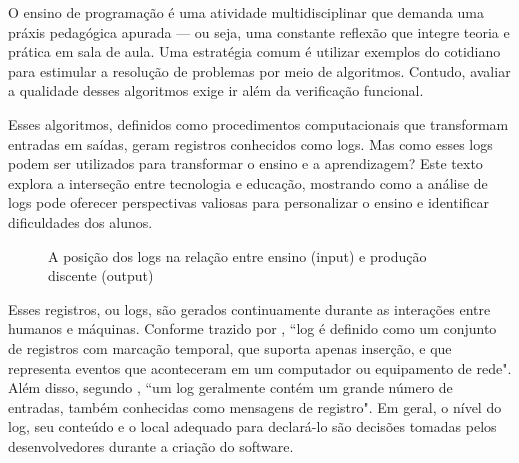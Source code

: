 O ensino de programação é uma atividade multidisciplinar que 
demanda uma práxis pedagógica apurada --- ou seja, uma constante 
reflexão que integre teoria e prática em sala de aula. Uma 
estratégia comum é utilizar exemplos do cotidiano para estimular 
a resolução de problemas por meio de algoritmos. Contudo, 
avaliar a qualidade desses algoritmos exige ir além da 
verificação funcional. 

Esses algoritmos, definidos como procedimentos computacionais que 
transformam entradas em saídas, geram registros conhecidos como 
logs. Mas como esses logs podem ser utilizados para transformar o 
ensino e a aprendizagem? Este texto explora a interseção entre 
tecnologia e educação, mostrando como a análise de logs pode 
oferecer perspectivas valiosas para personalizar o ensino e 
identificar dificuldades dos alunos.

\begin{figure}[H]
\centering
{}
\caption{A posição dos logs na relação entre ensino (input) e produção discente 
(output)}
\label{fig:logs-intersecao}
\end{figure}

Esses registros, ou logs, são gerados continuamente durante as 
interações entre humanos e máquinas. Conforme trazido por 
\cite{clemente2008arquitetura}, ``log é definido como um 
conjunto de registros com marcação temporal, que suporta apenas 
inserção, e que representa eventos que aconteceram em um 
computador ou equipamento de rede". 
Além disso, segundo \cite{gu2022logging}, ``um log geralmente 
contém um grande número de entradas, também conhecidas como 
mensagens de registro". Em geral, o nível do log, seu conteúdo e 
o local adequado para declará-lo são decisões tomadas pelos 
desenvolvedores durante a criação do software.


